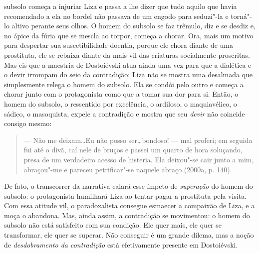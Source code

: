 subsolo começa a injuriar Liza e passa a lhe dizer que tudo aquilo que
havia recomendado a ela no bordel não passava de um engodo para
seduzi"-la e torná"-lo altivo perante seus olhos. O homem do subsolo se
faz trêmulo, diz e se desdiz e, no ápice da fúria que se mescla ao
torpor, começa a chorar. Ora, mais um motivo para despertar sua
suscetibilidade doentia, porque ele chora diante de uma prostituta, ele
se rebaixa diante da mais vil das criaturas socialmente proscritas. Mas
eis que a maestria de Dostoiévski atua ainda uma vez para que a
dialética e o devir irrompam do seio da contradição: Liza não se mostra
uma desalmada que simplesmente relega o homem do subsolo. Ela se condói
pelo outro e começa a chorar junto com o protagonista como que a tomar
sua dor para si. Então, o homem do subsolo, o ressentido por excelência,
o ardiloso, o maquiavélico, o sádico, o masoquista, expele a contradição
e mostra que seu \emph{devir} não coincide consigo mesmo:

\begin{quote}
--- Não me deixam\ldots Eu não posso ser\ldots bondoso! --- mal proferi; em
seguida fui até o divã, caí nele de bruços e passei um quarto de hora
soluçando, presa de um verdadeiro acesso de histeria. Ela deixou"-se cair
junto a mim, abraçou"-me e pareceu petrificar"-se naquele abraço (2000a,
p. 140).
\end{quote}

De fato, o transcorrer da narrativa calará esse ímpeto de
\emph{superação} do homem do subsolo: o protagonista humilhará Liza ao
tentar pagar a prostituta pela visita. Com essa atitude vil, o
paradoxalista consegue esmaecer a compaixão de Liza, e a moça o
abandona. Mas, ainda assim, a contradição se movimentou: o homem do
subsolo não está satisfeito com sua condição. Ele quer mais, ele quer se
transformar, ele quer se superar. Não conseguir é um grande dilema, mas
a noção de \emph{desdobramento da contradição} está efetivamente
presente em Dostoiévski.

